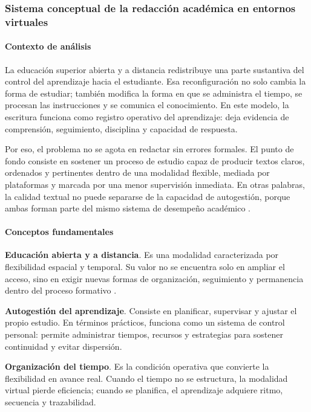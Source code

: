 \subsubsection{Sistema conceptual de la redacción académica en entornos virtuales}

\paragraph{Contexto de análisis}

La educación superior abierta y a distancia redistribuye una parte sustantiva del control del aprendizaje hacia el estudiante. Esa reconfiguración no solo cambia la forma de estudiar; también modifica la forma en que se administra el tiempo, se procesan las instrucciones y se comunica el conocimiento. En este modelo, la escritura funciona como registro operativo del aprendizaje: deja evidencia de comprensión, seguimiento, disciplina y capacidad de respuesta.

Por eso, el problema no se agota en redactar sin errores formales. El punto de fondo consiste en sostener un proceso de estudio capaz de producir textos claros, ordenados y pertinentes dentro de una modalidad flexible, mediada por plataformas y marcada por una menor supervisión inmediata. En otras palabras, la calidad textual no puede separarse de la capacidad de autogestión, porque ambas forman parte del mismo sistema de desempeño académico \citep{vitoriaEscrituraAcademicaFormacion2019,correaManualBasicoEscritura2018}.

\paragraph{Conceptos fundamentales}

\textbf{Educación abierta y a distancia}. Es una modalidad caracterizada por flexibilidad espacial y temporal. Su valor no se encuentra solo en ampliar el acceso, sino en exigir nuevas formas de organización, seguimiento y permanencia dentro del proceso formativo \citep{vitoriaEscrituraAcademicaFormacion2019}.

\textbf{Autogestión del aprendizaje}. Consiste en planificar, supervisar y ajustar el propio estudio. En términos prácticos, funciona como un sistema de control personal: permite administrar tiempos, recursos y estrategias para sostener continuidad y evitar dispersión.

\textbf{Organización del tiempo}. Es la condición operativa que convierte la flexibilidad en avance real. Cuando el tiempo no se estructura, la modalidad virtual pierde eficiencia; cuando se planifica, el aprendizaje adquiere ritmo, secuencia y trazabilidad.


